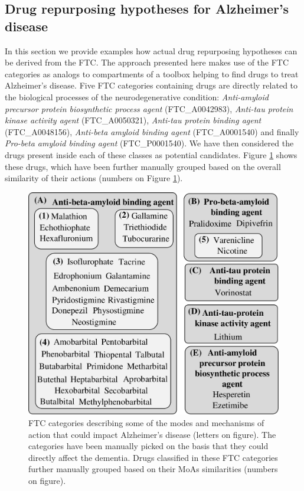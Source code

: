\documentclass{bioinfo}
\begin{document}
\subsection{Drug repurposing hypotheses for Alzheimer's disease}
In this section we provide examples how actual drug repurposing hypotheses can be derived from the FTC. 
The approach presented here makes use of the FTC categories as analogs to compartments of a toolbox helping to 
find drugs to treat Alzheimer's disease. Five FTC categories containing drugs are directly related to the biological 
processes of the neurodegenerative condition: \emph{Anti-amyloid precursor protein biosynthetic process agent} (FTC\_A0042983), 
\emph{Anti-tau protein kinase activity agent} (FTC\_A0050321), \emph{Anti-tau protein binding agent} (FTC\_A0048156), 
\emph{Anti-beta amyloid 
binding agent} (FTC\_A0001540) and finally \emph{Pro-beta amyloid binding agent} (FTC\_P0001540). We have then considered the drugs present 
inside each of these classes as potential candidates. Figure \ref{fig:05} shows these drugs, which have been further manually grouped 
based on the overall similarity of their actions (numbers on Figure \ref{fig:05}).

\begin{figure}[!tpb]%
\centerline{\includegraphics{fig5.png}}
\caption{FTC categories describing some of the modes and mechanisms of 
action that could impact Alzheimer's disease (letters on figure). The categories have been manually picked on the basis that they could directly affect
the dementia. Drugs classified in these FTC categories further 
manually grouped based on their MoAs similarities (numbers on figure).}\label{fig:05}
\end{figure}
 
\end{document}
